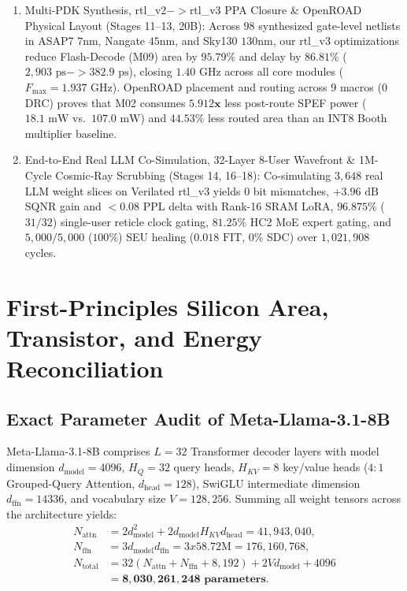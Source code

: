 \documentclass[10pt,journal,compsoc]{IEEEtran}
\def\texttt#1{#1}%
\def\textbf#1{#1}%
\def\to{->}%
\def\times{x}%
\begin{document}
\begin{enumerate}
    \item \textbf{Multi-PDK Synthesis, \texttt{rtl\_v2}$\to$\texttt{rtl\_v3} PPA Closure \& OpenROAD Physical Layout (Stages 11--13, 20B)}: Across $98$ synthesized gate-level netlists in ASAP7 $7\text{nm}$, Nangate $45\text{nm}$, and Sky130 $130\text{nm}$, our \texttt{rtl\_v3} optimizations reduce Flash-Decode (\texttt{M09}) area by $95.79\%$ and delay by $86.81\%$ ($2,903\text{ ps} \to 382.9\text{ ps}$), closing $1.40\text{ GHz}$ across all core modules ($F_{\max}=1.937\text{ GHz}$). OpenROAD placement and routing across $9$ macros ($0$ DRC) proves that \texttt{M02} consumes $\mathbf{5.912\times}$ less post-route SPEF power ($18.1\text{ mW}$ vs.\ $107.0\text{ mW}$) and $44.53\%$ less routed area than an \texttt{INT8} Booth multiplier baseline.
    \item \textbf{End-to-End Real LLM Co-Simulation, 32-Layer 8-User Wavefront \& 1M-Cycle Cosmic-Ray Scrubbing (Stages 14, 16--18)}: Co-simulating $3,648$ real LLM weight slices on Verilated \texttt{rtl\_v3} yields $0$ bit mismatches, $+3.96\text{ dB}$ SQNR gain and $<0.08$ PPL delta with Rank-16 SRAM LoRA, $96.875\%$ ($31/32$) single-user reticle clock gating, $81.25\%$ HC2 MoE expert gating, and $5,000/5,000$ ($100\%$) SEU healing ($0.018\text{ FIT}$, $0\%$ SDC) over $1,021,908$ cycles.
\end{enumerate}

\section{First-Principles Silicon Area, Transistor, and Energy Reconciliation}
\subsection{Exact Parameter Audit of \texttt{Meta-Llama-3.1-8B}}
\texttt{Meta-Llama-3.1-8B} \cite{dubey2024llama3} comprises $L=32$ Transformer decoder layers with model dimension $d_{\text{model}}=4096$, $H_Q=32$ query heads, $H_{KV}=8$ key/value heads ($4:1$ Grouped-Query Attention, $d_{\text{head}}=128$), SwiGLU intermediate dimension $d_{\text{ffn}}=14336$, and vocabulary size $V=128,256$. Summing all weight tensors across the architecture yields:
\begin{align}
N_{\text{attn}} &= 2 d_{\text{model}}^2 + 2 d_{\text{model}}H_{KV}d_{\text{head}} = 41,943,040, \label{eq:n_attn}\\
N_{\text{ffn}} &= 3 d_{\text{model}} d_{\text{ffn}} = 3 \times 58.72\text{M} = 176,160,768, \label{eq:n_ffn}\\
N_{\text{total}} &= 32 (N_{\text{attn}} + N_{\text{ffn}} + 8,192) + 2 V d_{\text{model}} + 4096 \nonumber\\
&= \mathbf{8,030,261,248\text{ parameters}}. \label{eq:n_total}
\end{align}
\end{document}
